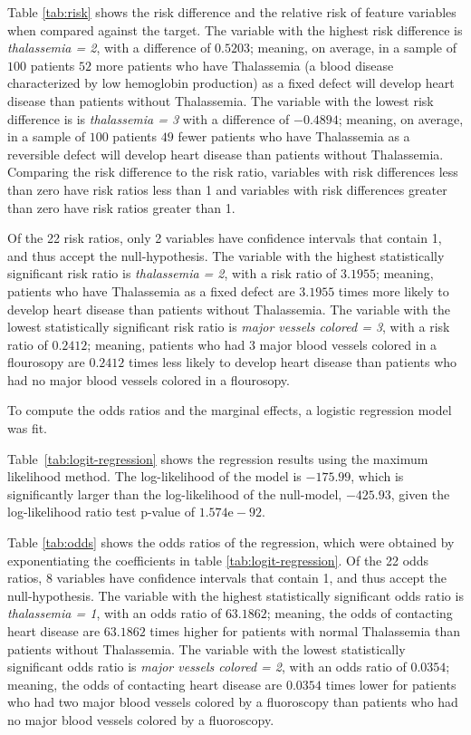 
Table \ref{tab:risk} shows the risk difference and the relative risk of feature variables when compared against the target.
The variable with the highest risk difference is \emph{thalassemia = 2}, with a difference of $0.5203$; meaning, on average, in a sample of $100$ patients $52$ more patients who have Thalassemia (a blood disease characterized by low hemoglobin production) as a fixed defect will develop heart disease than patients without Thalassemia.
The variable with the lowest risk difference is is \emph{thalassemia = 3} with a difference of $-0.4894$; meaning, on average, in a sample of $100$ patients $49$ fewer patients who have Thalassemia as a reversible defect will develop heart disease than patients without Thalassemia. 
Comparing the risk difference to the risk ratio, variables with risk differences less than zero have risk ratios less than 1 and variables with risk differences greater than zero have risk ratios greater than 1. 

Of the 22 risk ratios, only 2 variables have confidence intervals that contain 1, and thus accept the null-hypothesis. 
The variable with the highest statistically significant risk ratio is \emph{thalassemia = 2}, with a risk ratio of $3.1955$; meaning, patients who have Thalassemia as a fixed defect are $3.1955$ times more likely to develop heart disease than patients without Thalassemia.
The variable with the lowest statistically significant risk ratio is \emph{major vessels colored = 3}, with a risk ratio of $0.2412$; meaning, patients who had 3 major blood vessels colored in a flourosopy are $0.2412$ times less likely to develop heart disease than patients who had no major blood vessels colored in a flourosopy.


To compute the odds ratios and the marginal effects, a logistic regression model was fit.

Table~\ref{tab:logit-regression} shows the regression results using the maximum likelihood method.
The log-likelihood of the model is $-175.99$, which is significantly larger than the log-likelihood of the null-model, $-425.93$, given the log-likelihood ratio test p-value of $1.574\mathrm{e-}92$.

Table \ref{tab:odds} shows the odds ratios of the regression, which were obtained by exponentiating the coefficients in table \ref{tab:logit-regression}.
Of the 22 odds ratios, 8 variables have confidence intervals that contain 1, and thus accept the null-hypothesis.
The variable with the highest statistically significant odds ratio is \emph{thalassemia = 1}, with an odds ratio of $63.1862$; meaning, the odds of contacting heart disease are $63.1862$ times higher for patients with normal Thalassemia than patients without Thalassemia.
The variable with the lowest statistically significant odds ratio is \emph{major vessels colored = 2}, with an odds ratio of $0.0354$; meaning, the odds of contacting heart disease are $0.0354$ times lower for patients who had two major blood vessels colored by a fluoroscopy than patients who had no major blood vessels colored by a fluoroscopy.


